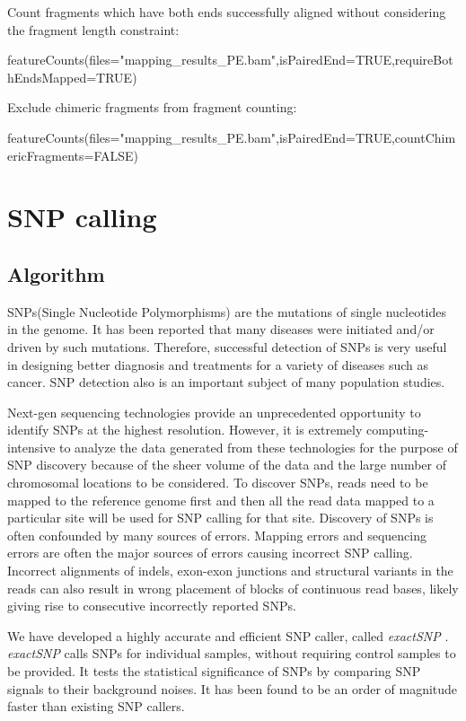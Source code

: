 \documentclass[12pt]{report}
\begin{document}
\noindent Count fragments which have both ends successfully aligned without considering the fragment length constraint:

\begin{Rcode}
featureCounts(files="mapping_results_PE.bam",isPairedEnd=TRUE,requireBothEndsMapped=TRUE)
\end{Rcode}

\noindent Exclude chimeric fragments from fragment counting:

\begin{Rcode}
featureCounts(files="mapping_results_PE.bam",isPairedEnd=TRUE,countChimericFragments=FALSE)
\end{Rcode}

\chapter{SNP calling}

\section{Algorithm}

SNPs(Single Nucleotide Polymorphisms) are the mutations of single nucleotides in the genome.
It has been reported that many diseases were initiated and/or driven by such mutations.
Therefore, successful detection of SNPs is very useful in designing better diagnosis and treatments for a variety of diseases such as cancer.
SNP detection also is an important subject of many population studies.

Next-gen sequencing technologies provide an unprecedented opportunity to identify SNPs at the highest resolution.
However, it is extremely computing-intensive to analyze the data generated from these technologies for the purpose of SNP discovery  because of the sheer volume of the data and the large number of chromosomal locations to be considered.
To discover SNPs, reads need to be mapped to the reference genome first and then all the read data mapped to a particular site will be used for SNP calling for that site.
Discovery of SNPs is often confounded by many sources of errors.
Mapping errors and sequencing errors are often the major sources of errors causing incorrect SNP calling.
Incorrect alignments of indels, exon-exon junctions and structural variants in the reads can also result in wrong placement of blocks of continuous read bases, likely giving rise to consecutive incorrectly reported SNPs.

We have developed a highly accurate and efficient SNP caller, called \emph{exactSNP} \cite{exactSNP}.
\emph{exactSNP} calls SNPs for individual samples, without requiring control samples to be provided.
It tests the statistical significance of SNPs by comparing SNP signals to their background noises.
It has been found to be an order of magnitude faster than existing SNP callers.
\end{document}
